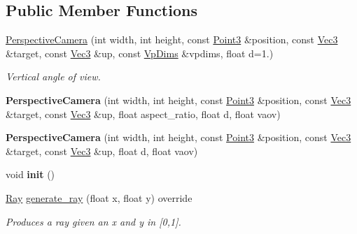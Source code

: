 \subsection*{Public Member Functions}
\begin{DoxyCompactItemize}
\item 
\mbox{\label{classomg_1_1_perspective_camera_a47871acb18140e1fab0a0ebd0396a3ae}} 
\mbox{\hyperlink{classomg_1_1_perspective_camera_a47871acb18140e1fab0a0ebd0396a3ae}{Perspective\+Camera}} (int width, int height, const \mbox{\hyperlink{namespaceomg_af85242d35fdacf829d32a6f9b95f3e35}{Point3}} \&position, const \mbox{\hyperlink{namespaceomg_a45a9482677fee9933ff369b49894e316}{Vec3}} \&target, const \mbox{\hyperlink{namespaceomg_a45a9482677fee9933ff369b49894e316}{Vec3}} \&up, const \mbox{\hyperlink{structomg_1_1_camera_1_1_vp_dims}{Vp\+Dims}} \&vpdims, float d=1.)
\begin{DoxyCompactList}\small\item\em Vertical angle of view. \end{DoxyCompactList}\item 
\mbox{\label{classomg_1_1_perspective_camera_a9148417266fda27d5438ace4ee63f9dd}} 
{\bfseries Perspective\+Camera} (int width, int height, const \mbox{\hyperlink{namespaceomg_af85242d35fdacf829d32a6f9b95f3e35}{Point3}} \&position, const \mbox{\hyperlink{namespaceomg_a45a9482677fee9933ff369b49894e316}{Vec3}} \&target, const \mbox{\hyperlink{namespaceomg_a45a9482677fee9933ff369b49894e316}{Vec3}} \&up, float aspect\+\_\+ratio, float d, float vaov)
\item 
\mbox{\label{classomg_1_1_perspective_camera_a5c466e416ace786d3a15b40b4edfd365}} 
{\bfseries Perspective\+Camera} (int width, int height, const \mbox{\hyperlink{namespaceomg_af85242d35fdacf829d32a6f9b95f3e35}{Point3}} \&position, const \mbox{\hyperlink{namespaceomg_a45a9482677fee9933ff369b49894e316}{Vec3}} \&target, const \mbox{\hyperlink{namespaceomg_a45a9482677fee9933ff369b49894e316}{Vec3}} \&up, float d, float vaov)
\item 
\mbox{\label{classomg_1_1_perspective_camera_a98f41e4dc92c2c9beabf7c235f5dd4eb}} 
void {\bfseries init} ()
\item 
\mbox{\hyperlink{classomg_1_1_ray}{Ray}} \mbox{\hyperlink{classomg_1_1_perspective_camera_a6d849c2b0768f12aed7b50d3ce87afeb}{generate\+\_\+ray}} (float x, float y) override
\begin{DoxyCompactList}\small\item\em Produces a ray given an x and y in \mbox{[}0,1\mbox{]}. \end{DoxyCompactList}\end{DoxyCompactItemize}
